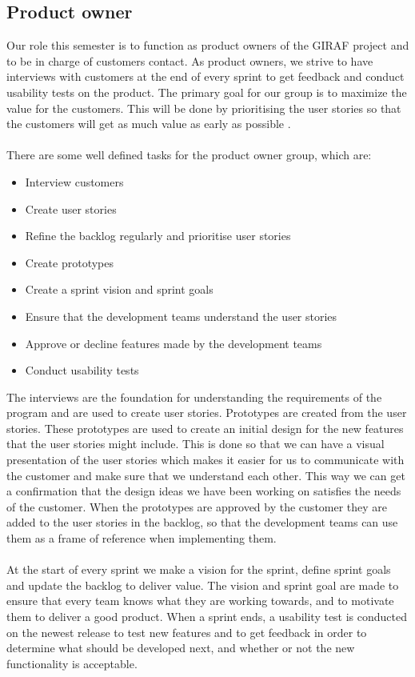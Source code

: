 \subsection{Product owner}
Our role this semester is to function as product owners of the GIRAF project and to be in charge of customers contact. 
As product owners, we strive to have interviews with customers at the end of every sprint to get feedback and conduct usability tests on the product.
The primary goal for our group is to maximize the value for the customers. 
This will be done by prioritising the user stories so that the customers will get as much value as early as possible \autocite{TheScrumGuide}.\\
\\
There are some well defined tasks for the product owner group, which are:
\begin{itemize}
    \item Interview customers
    \item Create user stories    
    \item Refine the backlog regularly and prioritise user stories
    \item Create prototypes
    \item Create a sprint vision and sprint goals
    \item Ensure that the development teams understand the user stories
    \item Approve or decline features made by the development teams
    \item Conduct usability tests
\end{itemize}
\noindent
The interviews are the foundation for understanding the requirements of the program and are used to create user stories. 
Prototypes are created from the user stories.
These prototypes are used to create an initial design for the new features that the user stories might include. 
This is done so that we can have a visual presentation of the user stories which makes it easier for us to communicate with the customer and make sure that we understand each other. 
This way we can get a confirmation that the design ideas we have been working on satisfies the needs of the customer.
When the prototypes are approved by the customer they are added to the user stories in the backlog, so that the development teams can use them as a frame of reference when implementing them.
\\\\
At the start of every sprint we make a vision for the sprint, define sprint goals and update the backlog to deliver value. 
The vision and sprint goal are made to ensure that every team knows what they are working towards, and to motivate them to deliver a good product.
When a sprint ends, a usability test is conducted on the newest release to test new features and to get feedback in order to determine what should be developed next, and whether or not the new functionality is acceptable.

